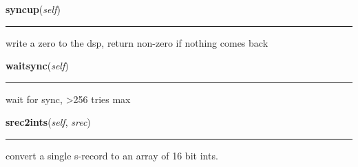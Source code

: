     \label{sload:sloader:syncup}

    \vspace{0.5ex}

    \begin{boxedminipage}{\textwidth}

    \raggedright \textbf{syncup}(\textit{self})

    \vspace{-1.5ex}

    \rule{\textwidth}{0.5\fboxrule}
    write a zero to the dsp, return non-zero if nothing comes back

    \vspace{1ex}

    \end{boxedminipage}

    \label{sload:sloader:waitsync}

    \vspace{0.5ex}

    \begin{boxedminipage}{\textwidth}

    \raggedright \textbf{waitsync}(\textit{self})

    \vspace{-1.5ex}

    \rule{\textwidth}{0.5\fboxrule}
    wait for sync, {\textgreater}256 tries max

    \vspace{1ex}

    \end{boxedminipage}

    \label{sload:sloader:srec2ints}

    \vspace{0.5ex}

    \begin{boxedminipage}{\textwidth}

    \raggedright \textbf{srec2ints}(\textit{self}, \textit{srec})

    \vspace{-1.5ex}

    \rule{\textwidth}{0.5\fboxrule}
    convert a single s-record to an array of 16 bit ints.

    \vspace{1ex}

    \end{boxedminipage}

